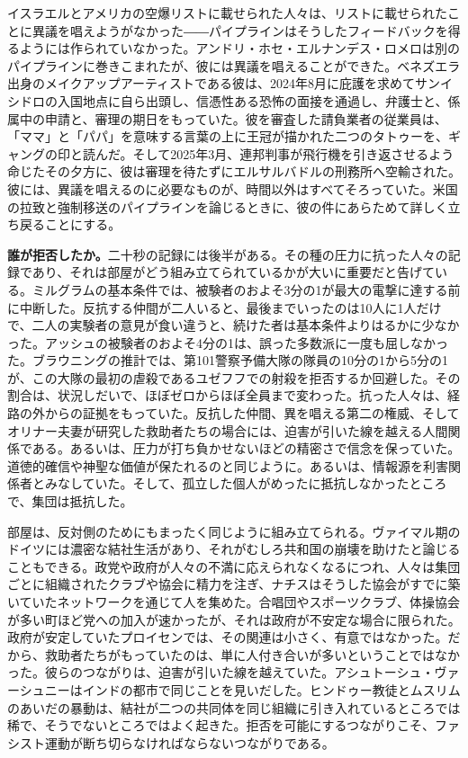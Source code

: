 イスラエルとアメリカの空爆リストに載せられた人々は、リストに載せられたことに異議を唱えようがなかった――パイプラインはそうしたフィードバックを得るようには作られていなかった。アンドリ・ホセ・エルナンデス・ロメロは別のパイプラインに巻きこまれたが、彼には異議を唱えることができた。ベネズエラ出身のメイクアップアーティストである彼は、2024年8月に庇護を求めてサンイシドロの入国地点に自ら出頭し、信憑性ある恐怖の面接を通過し、弁護士と、係属中の申請と、審理の期日をもっていた\autocite{LULAC2025HernandezRomero,Vega2025HernandezRomero}。彼を審査した請負業者の従業員は、「ママ」と「パパ」を意味する言葉の上に王冠が描かれた二つのタトゥーを、ギャングの印と読んだ\autocite{Palomera2025Blade}。そして2025年3月、連邦判事が飛行機を引き返させるよう命じたその夕方に、彼は審理を待たずにエルサルバドルの刑務所へ空輸された\autocite{jgg2025contempt}。彼には、異議を唱えるのに必要なものが、時間以外はすべてそろっていた。米国の拉致と強制移送のパイプラインを論じるときに、彼の件にあらためて詳しく立ち戻ることにする。

\textbf{誰が拒否したか。}二十秒の記録には後半がある。その種の圧力に抗った人々の記録であり、それは部屋がどう組み立てられているかが大いに重要だと告げている。ミルグラムの基本条件では、被験者のおよそ3分の1が最大の電撃に達する前に中断した。反抗する仲間が二人いると、最後までいったのは10人に1人だけで、二人の実験者の意見が食い違うと、続けた者は基本条件よりはるかに少なかった\autocite{milgram1974obedience}。アッシュの被験者のおよそ4分の1は、誤った多数派に一度も屈しなかった\autocite{asch1956studies}。ブラウニングの推計では、第101警察予備大隊の隊員の10分の1から5分の1が、この大隊の最初の虐殺であるユゼフフでの射殺を拒否するか回避した\autocite{browning1992ordinary}。その割合は、状況しだいで、ほぼゼロからほぼ全員まで変わった。抗った人々は、経路の外からの証拠をもっていた。反抗した仲間、異を唱える第二の権威、そしてオリナー夫妻が研究した救助者たちの場合には、迫害が引いた線を越える人間関係である\autocite{oliner1988altruistic}。あるいは、圧力が打ち負かせないほどの精密さで信念を保っていた。道徳的確信や神聖な価値が保たれるのと同じように\autocite{skitka2009limits,ginges2007sacred}。あるいは、情報源を利害関係者とみなしていた。そして、孤立した個人がめったに抵抗しなかったところで、集団は抵抗した\autocite{gamson1982encounters}。

部屋は、反対側のためにもまったく同じように組み立てられる。ヴァイマル期のドイツには濃密な結社生活があり、それがむしろ共和国の崩壊を助けたと論じることもできる。政党や政府が人々の不満に応えられなくなるにつれ、人々は集団ごとに組織されたクラブや協会に精力を注ぎ、ナチスはそうした協会がすでに築いていたネットワークを通じて人を集めた\autocite{berman1997weimar}。合唱団やスポーツクラブ、体操協会が多い町ほど党への加入が速かったが、それは政府が不安定な場合に限られた。政府が安定していたプロイセンでは、その関連は小さく、有意ではなかった\autocite{satyanath2017bowling}。だから、救助者たちがもっていたのは、単に人付き合いが多いということではなかった。彼らのつながりは、迫害が引いた線を越えていた。アシュトーシュ・ヴァーシュニーはインドの都市で同じことを見いだした。ヒンドゥー教徒とムスリムのあいだの暴動は、結社が二つの共同体を同じ組織に引き入れているところでは稀で、そうでないところではよく起きた\autocite{varshney2002ethnic}。拒否を可能にするつながりこそ、ファシスト運動が断ち切らなければならないつながりである。

